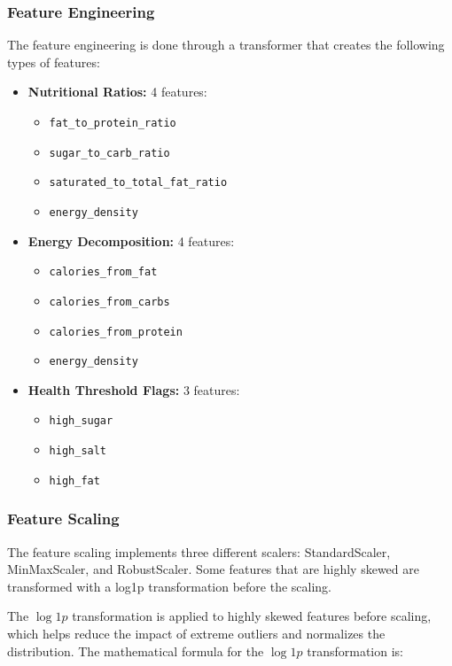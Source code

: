 \documentclass[11pt,a4paper]{article}
\begin{document}
\subsubsection{Feature Engineering}
The feature engineering is done through a transformer that creates the following types of features:
\begin{itemize}
    \item \textbf{Nutritional Ratios:} 4 features:
    \begin{itemize}
        \item \texttt{fat\_to\_protein\_ratio}
        \item \texttt{sugar\_to\_carb\_ratio}
        \item \texttt{saturated\_to\_total\_fat\_ratio}
        \item \texttt{energy\_density}
    \end{itemize}
    \item \textbf{Energy Decomposition:} 4 features:
    \begin{itemize}
        \item \texttt{calories\_from\_fat}
        \item \texttt{calories\_from\_carbs}
        \item \texttt{calories\_from\_protein}
        \item \texttt{energy\_density}
    \end{itemize}
    \item \textbf{Health Threshold Flags:} 3 features:
    \begin{itemize}
        \item \texttt{high\_sugar}
        \item \texttt{high\_salt}
        \item \texttt{high\_fat}
    \end{itemize}
\end{itemize}

\subsubsection{Feature Scaling}
The feature scaling implements three different scalers: StandardScaler, MinMaxScaler, and RobustScaler.
Some features that are highly skewed are transformed with a log1p transformation before the scaling.



The $\log1p$ transformation is applied to highly skewed features before scaling, which helps reduce the impact of extreme outliers and normalizes the distribution. 
The mathematical formula for the $\log1p$ transformation is:
\end{document}
